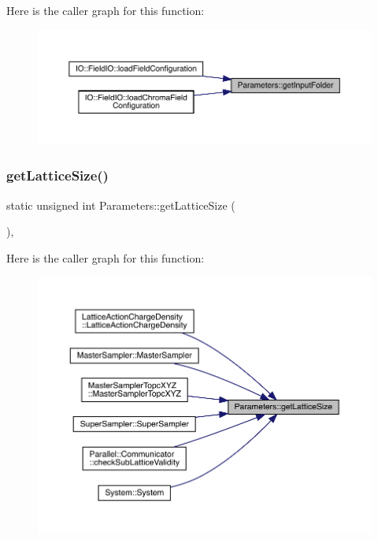 Here is the caller graph for this function\+:\nopagebreak
\begin{figure}[H]
\begin{center}
\leavevmode
\includegraphics[width=350pt]{class_parameters_aa593520a8f1c3282e399feb0cf70217b_icgraph}
\end{center}
\end{figure}
\mbox{\label{class_parameters_a128ccc4cb31e9930a825cfd3b8e83d2e}} 
\subsubsection{\texorpdfstring{getLatticeSize()}{getLatticeSize()}}
{\footnotesize\ttfamily static unsigned int Parameters\+::get\+Lattice\+Size (\begin{DoxyParamCaption}{ }\end{DoxyParamCaption})\hspace{0.3cm}{\ttfamily [inline]}, {\ttfamily [static]}}

Here is the caller graph for this function\+:\nopagebreak
\begin{figure}[H]
\begin{center}
\leavevmode
\includegraphics[width=350pt]{class_parameters_a128ccc4cb31e9930a825cfd3b8e83d2e_icgraph}
\end{center}
\end{figure}
\mbox{\label{class_parameters_aabe7e3a2468cf11bb5e98e626cb94ff2}} 
